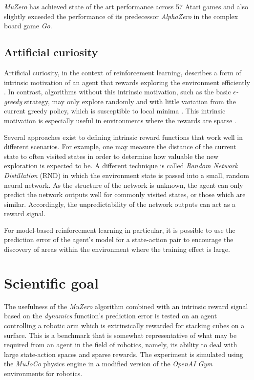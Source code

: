 \documentclass{article}
\begin{document}
\textit{MuZero} has achieved state of the art performance across 57 Atari games and also slightly exceeded the performance of its predecessor \textit{AlphaZero} in the complex board game \textit{Go}.

\subsection{Artificial curiosity}
Artificial curiosity, in the context of reinforcement learning, describes a form of intrinsic motivation of an agent that rewards exploring the environment efficiently \cite{curious}. In contrast, algorithms without this intrinsic motivation, such as the basic \textit{$\epsilon$-greedy} strategy, may only explore randomly and with little variation from the current greedy policy, which is susceptible to local minima \cite{bible}. This intrinsic motivation is especially useful in environments where the rewards are sparse \cite{curious}.

Several approaches exist to defining intrinsic reward functions that work well in different scenarios. For example, one may measure the distance of the current state to often visited states in order to determine how valuable the new exploration is expected to be. A different technique is called \textit{Random Network Distillation} (RND) in which the environment state is passed into a small, random neural network. As the structure of the network is unknown, the agent can only predict the network outputs well for commonly visited states, or those which are similar. Accordingly, the unpredictability of the network outputs can act as a reward signal. \cite{curious}

For model-based reinforcement learning in particular, it is possible to use the prediction error of the agent's model for a state-action pair to encourage the discovery of areas within the environment where the training effect is large. \cite{curious}

\section{Scientific goal}
The usefulness of the \textit{MuZero} algorithm combined with an intrinsic reward signal based on the \textit{dynamics} function's prediction error is tested on an agent controlling a robotic arm which is extrinsically rewarded for stacking cubes on a surface. This is a benchmark that is somewhat representative of what may be required from an agent in the field of robotics, namely, its ability to deal with large state-action spaces and sparse rewards. The experiment is simulated using the \textit{MuJoCo} \cite{gym} physics engine in a modified version of the \textit{OpenAI Gym} \cite{gym} environments for robotics.
\end{document}
